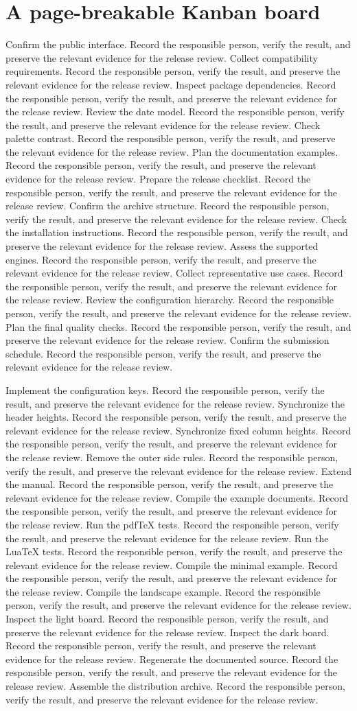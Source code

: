 \documentclass[a4paper]{article}
\newcommand{\workitem}[1]{#1. Record the responsible person, verify the result,
  and preserve the relevant evidence for the release review.}
\begin{document}
\section*{A page-breakable Kanban board}

\begin{kanban}[
  columns={Backlog,In progress,Review,Done},
  break,
  mode=light
]
    {\workitem{Confirm the public interface}}
    {\workitem{Collect compatibility requirements}}
    {\workitem{Inspect package dependencies}}
    {\workitem{Review the date model}}
    {\workitem{Check palette contrast}}
    {\workitem{Plan the documentation examples}}
    {\workitem{Prepare the release checklist}}
    {\workitem{Confirm the archive structure}}
    {\workitem{Check the installation instructions}}
    {\workitem{Assess the supported engines}}
    {\workitem{Collect representative use cases}}
    {\workitem{Review the configuration hierarchy}}
    {\workitem{Plan the final quality checks}}
    {\workitem{Confirm the submission schedule}}

    {\workitem{Implement the configuration keys}}
    {\workitem{Synchronize the header heights}}
    {\workitem{Synchronize fixed column heights}}
    {\workitem{Remove the outer side rules}}
    {\workitem{Extend the manual}}
    {\workitem{Compile the example documents}}
    {\workitem{Run the pdfTeX tests}}
    {\workitem{Run the LuaTeX tests}}
    {\workitem{Compile the minimal example}}
    {\workitem{Compile the landscape example}}
    {\workitem{Inspect the light board}}
    {\workitem{Inspect the dark board}}
    {\workitem{Regenerate the documented source}}
    {\workitem{Assemble the distribution archive}}


\end{kanban}
\end{document}
